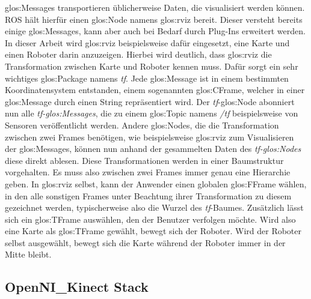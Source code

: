 \glspl{glos:Message} transportieren üblicherweise Daten, die visualisiert werden können. \gls{ROS} hält hierfür einen \gls{glos:Node} namens \gls{glos:rviz} bereit. Dieser versteht bereits einige \glspl{glos:Message}, kann aber auch bei Bedarf durch Plug-Ins erweitert werden. In dieser Arbeit wird \gls{glos:rviz} beispielsweise dafür eingesetzt, eine Karte und einen Roboter darin anzuzeigen. Hierbei wird deutlich, dass \gls{glos:rviz} die Transformation zwischen Karte und Roboter kennen muss. Dafür sorgt ein sehr wichtiges \gls{glos:Package} namens \emph{tf}. Jede \gls{glos:Message} ist in einem bestimmten Koordinatensystem entstanden, einem sogenannten \gls{glos:CFrame}, welcher in einer \gls{glos:Message} durch einen String repräsentiert wird. Der \emph{tf}-\gls{glos:Node} abonniert nun alle \emph{tf-\glspl{glos:Message}}, die zu einem \gls{glos:Topic} namens \emph{/tf} beispielsweise von Sensoren veröffentlicht werden. Andere \glspl{glos:Node}, die die Transformation zwischen zwei \glspl{Frame} benötigen, wie beispielsweise \gls{glos:rviz} zum Visualisieren der \glspl{glos:Message}, können nun anhand der gesammelten Daten des \emph{tf-\glspl{glos:Node}} diese direkt ablesen. Diese Transformationen werden in einer Baumstruktur vorgehalten. Es muss also zwischen zwei \glspl{Frame} immer genau eine Hierarchie geben. In \gls{glos:rviz} selbst, kann der Anwender einen globalen \gls{glos:FFrame} wählen, in den alle sonstigen \glspl{Frame} unter Beachtung ihrer Transformation zu diesem gezeichnet werden, typischerweise also die Wurzel des \emph{tf}-Baumes. Zusätzlich lässt sich ein \gls{glos:TFrame} auswählen, den der Benutzer verfolgen möchte. Wird also eine Karte als \gls{glos:TFrame} gewählt, bewegt sich der Roboter. Wird der Roboter selbst ausgewählt, bewegt sich die Karte während der Roboter immer in der Mitte bleibt.

\subsection{OpenNI\_Kinect Stack}
\label{subsec:opennistack}

